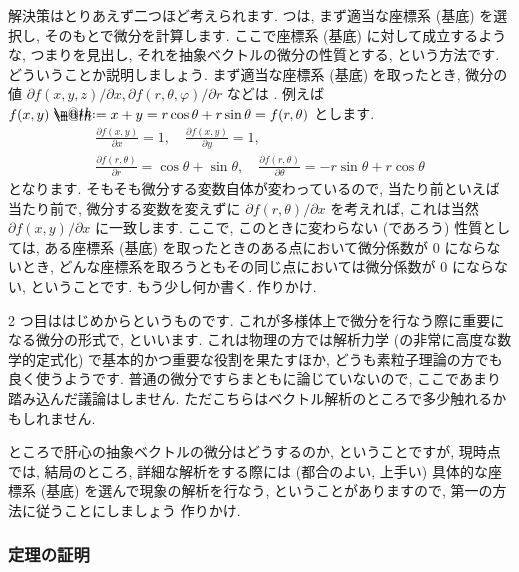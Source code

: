 \documentclass[openany, a4paper, oneside]{jsbook}
\makeatletter
\newcommand*{\defeq}{\mathrel{\rlap{%
\raisebox{0.3ex}{$\m@th\cdot$}}%
\raisebox{-0.3ex}{$\m@th\cdot$}}%
=}
\theoremstyle{break}
\theoremstyle{breakdefn}
\makeatother
\begin{document}
解決策はとりあえず二つほど考えられます.
 つは, まず適当な座標系 (基底) を選択し, そのもとで微分を計算します.
ここで座標系 (基底) に対して成立するような,
つまりを見出し,
それを抽象ベクトルの微分の性質とする, という方法です.
どういうことか説明しましょう.
まず適当な座標系 (基底) を取ったとき, 微分の値
$\partial f (x ,y , z) / \partial x , \partial f (r , \theta, \varphi) / \partial r$ などは
.
例えば $f (x, y) \defeq x + y = r \cos \theta + r \sin \theta = f ( r, \theta)$ とします.
\begin{gather}
 \frac{\partial  f ( x, y )} { \partial  x }
 =
 1, \quad
 \frac{\partial f ( x, y ) } { \partial  y }
 =
 1, \\
 \frac{\partial f (r, \theta )} { \partial r }
 =
 \cos \theta + \sin \theta, \quad
 \frac{\partial f (r, \theta )} { \partial \theta }
 =
 -r \sin \theta + r \cos \theta
\end{gather}
となります.
そもそも微分する変数自体が変わっているので, 当たり前といえば当たり前で,
微分する変数を変えずに $\partial f (r , \theta) / \partial x$ を考えれば, これは当然
 $\partial f ( x , y) / \partial x$ に一致します.
ここで, このときに変わらない (であろう) 性質としては,
ある座標系 (基底) を取ったときのある点において微分係数が $0$ にならないとき,
どんな座標系を取ろうともその同じ点においては微分係数が $0$ にならない, ということです.
もう少し何か書く. 作りかけ.

2 つ目ははじめからというものです.
これが多様体上で微分を行なう際に重要になる微分の形式で,
といいます.
これは物理の方では解析力学 (の非常に高度な数学的定式化) で基本的かつ重要な役割を果たすほか,
どうも素粒子理論の方でも良く使うようです.
普通の微分ですらまともに論じていないので, ここであまり踏み込んだ議論はしません.
ただこちらはベクトル解析のところで多少触れるかもしれません.

ところで肝心の抽象ベクトルの微分はどうするのか, ということですが,
現時点では, 結局のところ, 詳細な解析をする際には
(都合のよい, 上手い) 具体的な座標系 (基底) を選んで現象の解析を行なう,
ということがありますので,
第一の方法に従うことにしましょう
作りかけ.
\subsubsection{定理の証明}
\end{document}
